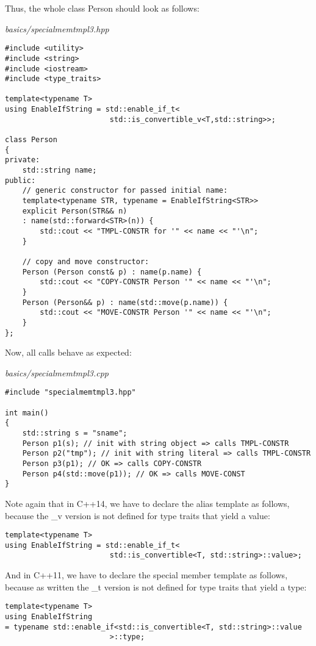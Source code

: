 Thus, the whole class Person should look as follows:

\noindent
\textit{basics/specialmemtmpl3.hpp}
\begin{lstlisting}[style=styleCXX]
#include <utility>
#include <string>
#include <iostream>
#include <type_traits>

template<typename T>
using EnableIfString = std::enable_if_t<
						std::is_convertible_v<T,std::string>>;

class Person
{
private:
	std::string name;
public:
	// generic constructor for passed initial name:
	template<typename STR, typename = EnableIfString<STR>>
	explicit Person(STR&& n)
	: name(std::forward<STR>(n)) {
		std::cout << "TMPL-CONSTR for '" << name << "'\n";
	}

	// copy and move constructor:
	Person (Person const& p) : name(p.name) {
		std::cout << "COPY-CONSTR Person '" << name << "'\n";
	}
	Person (Person&& p) : name(std::move(p.name)) {
		std::cout << "MOVE-CONSTR Person '" << name << "'\n";
	}
};
\end{lstlisting}

Now, all calls behave as expected:

\noindent
\textit{basics/specialmemtmpl3.cpp}
\begin{lstlisting}[style=styleCXX]
#include "specialmemtmpl3.hpp"

int main()
{
	std::string s = "sname";
	Person p1(s); // init with string object => calls TMPL-CONSTR
	Person p2("tmp"); // init with string literal => calls TMPL-CONSTR
	Person p3(p1); // OK => calls COPY-CONSTR
	Person p4(std::move(p1)); // OK => calls MOVE-CONST
}
\end{lstlisting}

Note again that in C++14, we have to declare the alias template as follows, because the \_v version is not defined for type traits that yield a value:

\begin{lstlisting}[style=styleCXX]
template<typename T>
using EnableIfString = std::enable_if_t<
						std::is_convertible<T, std::string>::value>;
\end{lstlisting}

And in C++11, we have to declare the special member template as follows, because as written the \_t version is not defined for type traits that yield a type:

\begin{lstlisting}[style=styleCXX]
template<typename T>
using EnableIfString
= typename std::enable_if<std::is_convertible<T, std::string>::value
						>::type;
\end{lstlisting}

